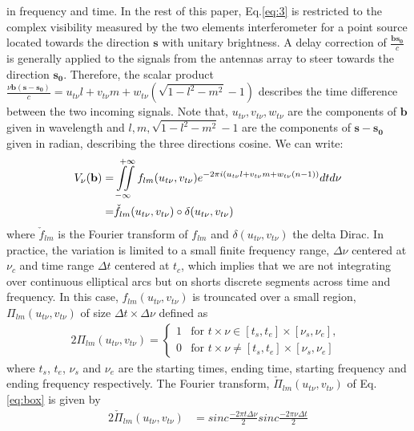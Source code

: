 in frequency and time. 
In the rest of this paper, Eq.\ref{eq:3} is restricted to the complex visibility
measured by the two elements interferometer for a point source located towards the direction 
$\mathbf{s}$ with unitary brightness. A delay correction of $\frac{\mathbf{b}\mathbf{s_0}}{c}$ is 
generally applied to the signals from the antennas 
array to steer towards the direction $\mathbf{s_0}$.
Therefore, the scalar product $\frac{\nu \mathbf{b}(\mathbf{s}-\mathbf{s_0})}{c}=u_{t\nu}l + v_{t\nu}m + w_{t\nu}(\sqrt{1-l^2 - m^2}-1)$
describes the time difference between the two incoming signals. Note that,
$u_{t\nu}, v_{t\nu}, w_{t\nu}$ are the components of  $\mathbf{b}$ 
given in wavelength and $l,m, \sqrt{1-l^2-m^2}-1$ are the components of  $\mathbf{s}-\mathbf{s_0}$ given in radian, describing the 
three directions cosine. 
We can write:
\begin{alignat}{2}
V_{\nu}(\mathbf{b})  =& \iint\limits_{-\infty}^{\hspace{.3cm}+\infty}f_{lm}(u_{t\nu},v_{t\nu})e^{-2\pi i (u_{t\nu}l+v_{t\nu}m+w_{t\nu}(n-1))}dt d\nu\\
		      =& \check{f}_{lm}(u_{t\nu},v_{t\nu})\circ \delta(u_{t\nu},v_{t\nu}) \label{eq:4}
\end{alignat} %
where $\check{f}_{lm}$ is the Fourier transform of $f_{lm}$ and $\delta(u_{t\nu},v_{t\nu})$ the delta Dirac.
In practice, the variation is limited to a small finite frequency range, $\Delta \nu$ centered at $\nu_c$ 
and time range $\Delta t$ centered
at $t_c$, which implies that we are not integrating over continuous elliptical arcs but on shorts discrete
segments across time and frequency. In this case,  $f_{lm}(u_{t\nu},v_{t\nu})$ is trouncated over a small region, $\Pi_{lm}(u_{t\nu},v_{t\nu})$ 
of size $\Delta t \times \Delta \nu$ defined as
\begin{alignat}{2}
\Pi_{lm}(u_{t\nu},v_{t\nu}) = \left\{
\begin{array}{rl}
1 & \mbox{for $\mathit{ t \times \nu \in  [t_s, t_e]\times [\nu_s, \nu_e]}$}, \\
0 & \mbox{for $\mathit{ t \times \nu \neq  [t_s, t_e]\times [\nu_s, \nu_e]}$ }
\end{array}\right.\label{eq:box}
\end{alignat}
where $t_s$, $t_e$, $\nu_s$ and $\nu_e$ are the starting times, ending time, starting frequency and ending frequency
 respectively. The Fourier transform, $\check{\Pi}_{lm}(u_{t\nu},v_{t\nu})$ of Eq.\ref{eq:box} is given by
\begin{alignat*}{2}
\check{\Pi}_{lm}(u_{t\nu},v_{t\nu})&=sinc\frac{-2\pi t\Delta \nu}{2}sinc\frac{-2\pi\nu\Delta t}{2}
\end{alignat*}
